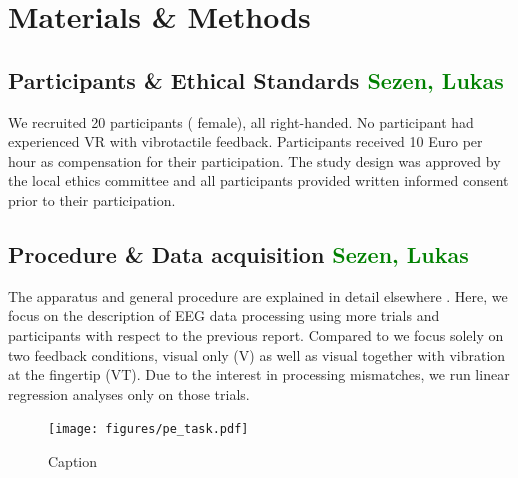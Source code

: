 \section{Materials \& Methods}
\subsection{Participants \& Ethical Standards \textcolor{green}{Sezen, Lukas}}
We recruited 20 participants ( female), all right-handed. No participant had experienced VR with vibrotactile feedback. Participants received 10 Euro per hour as compensation for their participation. The study design was approved by the local ethics committee and all participants provided written informed consent prior to their participation. 

\subsection{Procedure \& Data acquisition \textcolor{green}{Sezen, Lukas}}
The apparatus and general procedure are explained in detail elsewhere \citep{Gehrke_2019}. Here, we focus on the description of EEG data processing using more trials and participants with respect to the previous report. Compared to \citep{Gehrke_2019} we focus solely on two feedback conditions, visual only (V) as well as visual together with vibration at the fingertip (VT). Due to the interest in processing mismatches, we run linear regression analyses only on those trials.


\begin{figure}
    \centering
    \texttt{[image: figures/pe\_task.pdf]}
    \caption{Caption}
    \label{fig:my_label}
\end{figure}

